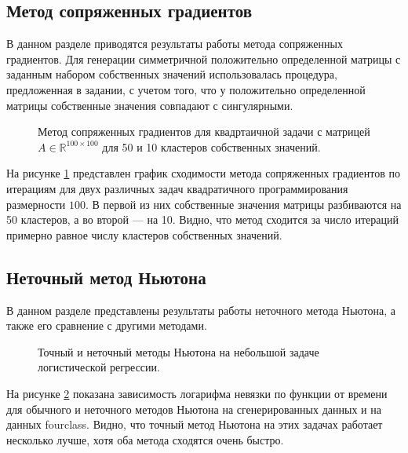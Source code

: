 \documentclass[12pt]{article}
\begin{document}
	\subsection{Метод сопряженных градиентов}
	
	\hspace{0.6cm}В данном разделе приводятся результаты работы метода сопряженных градиентов.
	Для генерации симметричной положительно определенной матрицы с заданным набором собственных значений использовалась процедура, предложенная в задании, с учетом того, что у положительно определенной матрицы собственные значения совпадают с сингулярными.  
	
	
	\begin{figure}[!h]
	\centering
	\subfloat{
		\scalebox{1.2}{
			
		}
	}
	\caption{Метод сопряженных градиентов для квадртаичной задачи с матрицей \newline $A \in \mathbb{R}^{100 \times 100}$ для 50 и 10 кластеров собственных значений.}
	\label{cg}
\end{figure}
	На рисунке \ref{cg} представлен график сходимости метода сопряженных градиентов по итерациям для двух различных задач квадратичного программирования размерности $100$. В первой из них собственные значения матрицы разбиваются на 50 кластеров, а во второй — на 10. Видно, что метод сходится за число итераций примерно равное числу кластеров собственных значений. 
	

	\subsection{Неточный метод Ньютона}
	
	\hspace{0.6cm} В данном разделе представлены результаты работы неточного метода Ньютона, а также его сравнение с другими методами. 
	
	
\begin{figure}[!h]
	\centering
	\subfloat{
		\scalebox{0.9}{
			
		}
	}
	\subfloat{
		\scalebox{0.9}{
                		
		}
	}
	\caption{Точный и неточный методы Ньютона на небольшой задаче логистической регрессии.}
	\label{hfn}
\end{figure}
	
	На рисунке \ref{hfn} показана зависимость логарифма невязки по функции от времени для обычного и неточного методов Ньютона на сгенерированных данных и на данных fourclass. Видно, что точный метод Ньютона на этих задачах работает несколько лучше, хотя оба метода сходятся очень быстро. 
	
\end{document}
